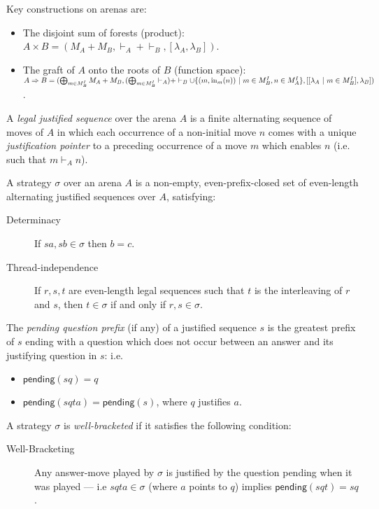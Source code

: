 \documentclass{eptcs}
\def\coprod{\bigoplus}
\newcommand{\pending}{{\mathsf{pending}}}
\newcommand{\inj}{\mathrm{in}}
\begin{document}
Key constructions on arenas are:
\begin{itemize} 
\item The disjoint sum of forests (product): $A \times B = (M_A + M_B,\vdash_A + \vdash_B, [\lambda_A,\lambda_B])$. 
\item The graft of $A$ onto the roots of $B$ (function space): $A \Rightarrow B =\\ (\coprod_{m \in M^I_B}M_A + M_B, (\coprod_{m \in M^I_B} \vdash_A) + \vdash_B \cup \{(m,\inj_m(n))\ |\ m \in M^I_B,n \in M^I_A\},[[\lambda_A\ |\ m \in M^I_B],\lambda_B])$.  
\end{itemize}


A \emph{legal justified sequence} over the  arena $A$ is a finite alternating  sequence of moves of $A$ in which each occurrence of a  non-initial move $n$  comes with a unique \emph{justification pointer} to a preceding occurrence of a move $m$ which  enables $n$ (i.e. such that $m \vdash_A n$). 

A  strategy $\sigma$ over an arena $A$ is a non-empty, even-prefix-closed set of even-length alternating justified sequences over $A$, satisfying: 
\begin{description}
\item [Determinacy]If $sa,sb \in \sigma$ then $b=c$. 
\item [Thread-independence] If $r,s,t$ are even-length legal sequences such that $t$ is the interleaving of $r$ and $s$, then $t  \in \sigma$ if and only if $r,s \in \sigma$.
\end{description} 

The \emph{pending question prefix} (if any) of a justified sequence $s$ is the greatest prefix of $s$ ending with a question which does not occur between an answer and its justifying question in $s$: i.e.
\begin{itemize}
\item $\pending(sq) = q$
\item $\pending(sqta) = \pending(s)$, where $q$ justifies $a$.
\end{itemize} 
A strategy $\sigma$ is \emph{well-bracketed} if it satisfies the following condition:
\begin{description}  
\item  [Well-Bracketing]Any answer-move played by $\sigma$ is justified by the question pending when it was played --- i.e $sqta \in \sigma$ (where $a$ points to $q$) implies $\pending(sqt) = sq$. 
\end{description}
\end{document}
